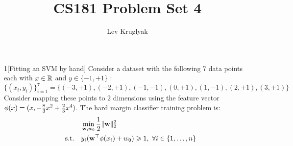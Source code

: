 \documentclass[expanded]{lkx_pset}
\title{CS181 Problem Set 4}
\author{Lev Kruglyak}
\begin{document}
\maketitle

\begin{problem}{1}[Fitting an SVM by hand]
Consider a dataset with the following 7 data points each with $x \in \mathbb{R}$ and $y \in \{ -1, +1 \}$ : \[\{(x_i, y_i)\}_{i = 1}^7 =\{(-3 , +1) , (-2 , +1 ) , (-1,  -1 ), (0, +1), ( 1 , -1 ), ( 2 , +1 ) , (3 , +1 )\}\] Consider
mapping these points to $2$ dimensions using the feature vector $\mathbf{\phi}(x) =  (x, -\frac{8}{3}x^2 + \frac{2}{3}x^4 )$. The hard margin classifier training problem is:
\begin{align*}
	                        & \min_{\mathbf{w}, w_0} \frac{1}{2}\|\mathbf{w}\|_2^2 \label{eq:dcp}               \\
	\quad \text{s.t.} \quad & y_i(\mathbf{w}^\top \mathbf{\phi}(x_i) + w_0) \geqslant 1,~\forall i \in \{1,\ldots, n\}\notag
\end{align*}
\end{problem}
\end{document}
